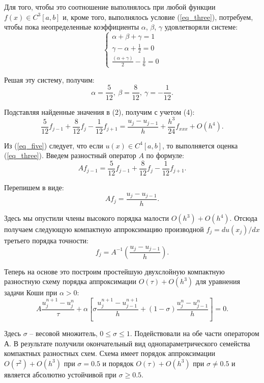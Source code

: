 \documentclass{article}
\begin{document}
Для того, чтобы это соотношение выполнялось при любой функции $f(x) \in C^3[a,b]$ и, кроме того, выполнялось условие (\ref{eq_three}), потребуем, чтобы пока неопределенные коэффициенты $\alpha$, $\beta$, $\gamma$ удовлетворяли системе:
$$  \left\{
        \begin{array}{l}
            \alpha + \beta + \gamma = 1 \\
            \gamma - \alpha + \frac{1}{2} = 0 \\
            \frac{ ( \alpha + \gamma ) }{2} - \frac{1}{6} = 0
        \end{array}
    \right. $$

Решая эту систему, получим:
$$\alpha=\frac{5}{12}, \: \beta=\frac{8}{12}, \: \gamma=-\frac{1}{12}.$$

Подставляя найденные значения в (2), получим с учетом (4):
\begin{equation}
\label{eq_five}
    \frac{5}{12}f_{j-1}+\frac{8}{12}f_j-\frac{1}{12}f_{j+1}=\frac{u_j-u_{j-1}}{h}+\frac{h^3}{24}f_{xxx}+O(h^4).
\end{equation}

Из (\ref{eq_five}) следует, что если $u(x) \in C^4[a, b]$, то выполняется оценка (\ref{eq_three}). Введем разностный оператор $A$ по формуле:
$$ A f_{j-1} = \frac{5}{12} f_{j-1} + \frac{8}{12} f_j - \frac{1}{12} f_{j+1}.$$

Перепишем в виде:
$$ A f_j = \frac{ u_j - u_{j-1} }{h}.$$

Здесь мы опустили члены высокого порядка малости $O(h^3) + O(h^4)$. Отсюда получаем следующую компактную аппроксимацию производной $f_j = du(x_j)/dx$ третьего порядка точности:
$$f_j=A^{-1}(\frac{u_j-u_{j-1}}{h}).$$

Теперь на основе это построим простейшую двухслойную компактную разностную схему порядка аппроксимации $O(\tau) + O(h^3)$ для уравнения  задачи Коши при $\alpha > 0$:
$$A\frac{u^{n+1}_j-u^n_j}{\tau}+\alpha[\sigma\frac{u^{n+1}_j-u^{n+1}_{j-1}}{h}+(1-\sigma)\frac{u^n_j-u^n_{j-1}}{h}]=0. $$

Здесь $\sigma$ – весовой множитель, $0 \le \sigma \le 1$. Подействовали на обе части оператором А. В результате получили окончательный вид однопараметрического семейства компактных разностных схем. Схема имеет порядок аппроксимации $O(\tau^2) + O(h^3)$ при $\sigma = 0.5$ и порядок $O(\tau) + O(h^3)$ при $\sigma \not= 0.5$ и является абсолютно устойчивой при $\sigma \ge 0.5$.
\end{document}
